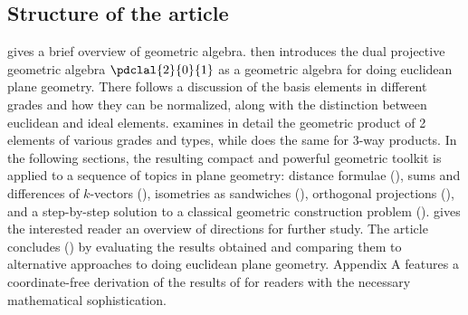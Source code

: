 \documentclass{birkjour}
\begin{document}
\subsection{Structure of the article} 
{
 gives a brief overview of geometric algebra.  then introduces the dual projective geometric algebra $\pdclal{2}{0}{1}$ as a geometric algebra for doing euclidean plane geometry. There follows a discussion of the basis elements in different grades and how they can be normalized,  along with the distinction between euclidean and ideal elements.   examines in detail the geometric product of 2  elements of various grades and types, while  does the same for 3-way products.   In the following sections, the resulting  compact and powerful geometric toolkit  is  applied to a sequence of topics in plane geometry:  distance formulae (), sums and differences of $k$-vectors (), isometries as sandwiches (), %
orthogonal projections (),  %
and a step-by-step solution to a classical geometric construction problem (). %
  gives the interested reader an overview of directions for further study.
The article concludes () by evaluating the results obtained and comparing them to alternative approaches to doing euclidean plane  geometry.  Appendix A features a coordinate-free derivation of the results of  for readers with the necessary mathematical sophistication.
}
 \vspace{-.05in}
\end{document}
